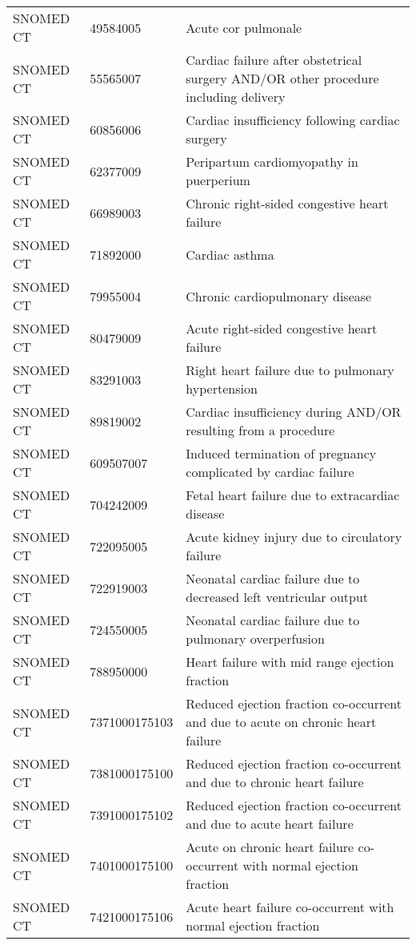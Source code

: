 \begin{longtable}{p{}p{}p{}}
  SNOMED CT & 49584005 & Acute cor pulmonale \\ 
  SNOMED CT & 55565007 & Cardiac failure after obstetrical surgery AND/OR other procedure including delivery \\ 
  SNOMED CT & 60856006 & Cardiac insufficiency following cardiac surgery \\ 
  SNOMED CT & 62377009 & Peripartum cardiomyopathy in puerperium \\ 
  SNOMED CT & 66989003 & Chronic right-sided congestive heart failure \\ 
  SNOMED CT & 71892000 & Cardiac asthma \\ 
  SNOMED CT & 79955004 & Chronic cardiopulmonary disease \\ 
  SNOMED CT & 80479009 & Acute right-sided congestive heart failure \\ 
  SNOMED CT & 83291003 & Right heart failure due to pulmonary hypertension \\ 
  SNOMED CT & 89819002 & Cardiac insufficiency during AND/OR resulting from a procedure \\ 
  SNOMED CT & 609507007 & Induced termination of pregnancy complicated by cardiac failure \\ 
  SNOMED CT & 704242009 & Fetal heart failure due to extracardiac disease \\ 
  SNOMED CT & 722095005 & Acute kidney injury due to circulatory failure \\ 
  SNOMED CT & 722919003 & Neonatal cardiac failure due to decreased left ventricular output \\ 
  SNOMED CT & 724550005 & Neonatal cardiac failure due to pulmonary overperfusion \\ 
  SNOMED CT & 788950000 & Heart failure with mid range ejection fraction \\ 
  SNOMED CT & 7371000175103 & Reduced ejection fraction co-occurrent and due to acute on chronic heart failure \\ 
  SNOMED CT & 7381000175100 & Reduced ejection fraction co-occurrent and due to chronic heart failure \\ 
  SNOMED CT & 7391000175102 & Reduced ejection fraction co-occurrent and due to acute heart failure \\ 
  SNOMED CT & 7401000175100 & Acute on chronic heart failure co-occurrent with normal ejection fraction \\ 
  SNOMED CT & 7421000175106 & Acute heart failure co-occurrent with normal ejection fraction \\ 

\end{longtable}
